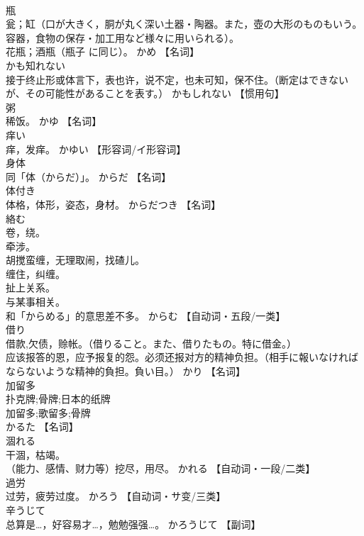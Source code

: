 \documentclass[8pt]{extreport}
\begin{document}
\begin{CJK}{UTF8}{min}
\\	瓶	
\\	瓮；缸（口が大きく，胴が丸く深い土器・陶器。また，壺の大形のものもいう。容器，食物の保存・加工用など様々に用いられる）。 
\\	花瓶；酒瓶（瓶子 に同じ）。	かめ		【名词】
\\	かも知れない	
\\	接于终止形或体言下，表也许，说不定，也未可知，保不住。（断定はできないが、その可能性があることを表す。）	かもしれない		【惯用句】
\\	粥	
\\	稀饭。	かゆ		【名词】
\\	痒い	
\\	痒，发痒。	かゆい		【形容词/イ形容词】
\\	身体	
\\	同「体（からだ）」。	からだ		【名词】
\\	体付き	
\\	体格，体形，姿态，身材。	からだつき		【名词】
\\	絡む	
\\	卷，绕。 
\\	牵涉。 
\\	胡搅蛮缠，无理取闹，找碴儿。 
\\	缠住，纠缠。 
\\	扯上关系。 
\\	与某事相关。 
\\	和「からめる」的意思差不多。	からむ		【自动词・五段/一类】
\\	借り	
\\	借款,欠债，赊帐。（借りること。また、借りたもの。特に借金。） 
\\	应该报答的恩，应予报复的怨。必须还报对方的精神负担。（相手に報いなければならないような精神的負担。負い目。）	かり		【名词】
\\	加留多	
\\	扑克牌;骨牌;日本的纸牌 
\\	加留多;歌留多;骨牌 
\\	かるた		【名词】
\\	涸れる	
\\	干涸，枯竭。 
\\	（能力、感情、财力等）挖尽，用尽。	かれる		【自动词・一段/二类】
\\	過労	
\\	过劳，疲劳过度。	かろう		【自动词・サ变/三类】
\\	辛うじて	
\\	总算是…，好容易才…，勉勉强强…。	かろうじて		【副词】

\end{CJK}
\end{document}
